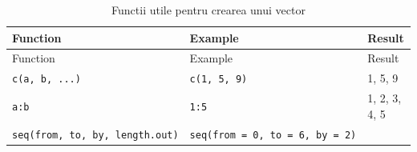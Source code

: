 \documentclass[]{article}
\begin{document}
\begin{longtable}[]{@{}lll@{}}
\caption{Functii utile pentru crearea unui vector}\tabularnewline
\toprule
\begin{minipage}[b]{0.34\columnwidth}\raggedright\strut
Function\strut
\end{minipage} & \begin{minipage}[b]{0.39\columnwidth}\raggedright\strut
Example\strut
\end{minipage} & \begin{minipage}[b]{0.15\columnwidth}\raggedright\strut
Result\strut
\end{minipage}\tabularnewline
\midrule
\endfirsthead
\toprule
\begin{minipage}[b]{0.34\columnwidth}\raggedright\strut
Function\strut
\end{minipage} & \begin{minipage}[b]{0.39\columnwidth}\raggedright\strut
Example\strut
\end{minipage} & \begin{minipage}[b]{0.15\columnwidth}\raggedright\strut
Result\strut
\end{minipage}\tabularnewline
\midrule
\endhead
\begin{minipage}[t]{0.34\columnwidth}\raggedright\strut
\texttt{c(a,\ b,\ ...)}\strut
\end{minipage} & \begin{minipage}[t]{0.39\columnwidth}\raggedright\strut
\texttt{c(1,\ 5,\ 9)}\strut
\end{minipage} & \begin{minipage}[t]{0.15\columnwidth}\raggedright\strut
1, 5, 9\strut
\end{minipage}\tabularnewline
\begin{minipage}[t]{0.34\columnwidth}\raggedright\strut
\texttt{a:b}\strut
\end{minipage} & \begin{minipage}[t]{0.39\columnwidth}\raggedright\strut
\texttt{1:5}\strut
\end{minipage} & \begin{minipage}[t]{0.15\columnwidth}\raggedright\strut
1, 2, 3, 4, 5\strut
\end{minipage}\tabularnewline
\begin{minipage}[t]{0.34\columnwidth}\raggedright\strut
\texttt{seq(from,\ to,\ by,\ length.out)}\strut
\end{minipage} & \begin{minipage}[t]{0.39\columnwidth}\raggedright\strut
\texttt{seq(from\ =\ 0,\ to\ =\ 6,\ by\ =\ 2)}\strut

\end{minipage}
\end{longtable}
\end{document}
